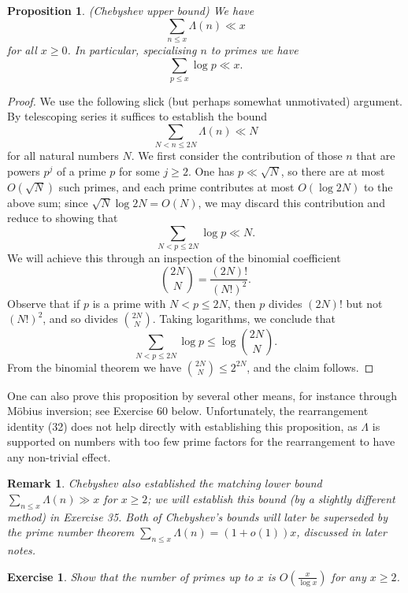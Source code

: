 \documentclass[10pt,reqno]{amsart}
\newtheorem{prop}[theorem]{Proposition}
\newtheorem{exercise}[theorem]{Exercise}
\newtheorem{remark}[theorem]{Remark}
\begin{document}
\begin{prop} (Chebyshev upper bound) We have
    \[  \sum_{n \leq x} \Lambda(n) \ll x\]
    for all $x \geq 0$. In particular, specialising $n$ to primes we have
    \[  \sum_{p \leq x} \log p \ll x.\]
\end{prop}
\begin{proof}
    We use the following slick (but perhaps somewhat unmotivated) argument. By telescoping series it suffices to establish the bound
    \[  \sum_{N < n \leq 2N} \Lambda(n) \ll N\]
    for all natural numbers $N$. We first consider the contribution of those $n$ that are powers $p^j$ of a prime $p$ for some $j \geq 2$. One has $p \ll \sqrt{N}$, so there are at most $O(\sqrt{N})$ such primes, and each prime contributes at most $O( \log 2N )$ to the above sum; since $\sqrt{N} \log 2N = O(N)$, we may discard this contribution and reduce to showing that
    \[  \sum_{N < p \leq 2N} \log p \ll N.\]
    We will achieve this through an inspection of the binomial coefficient
    \[  \binom{2N}{N} = \frac{(2N)!}{(N!)^2}.\]
    Observe that if $p$ is a prime with $N < p \leq 2N$, then $p$ divides $(2N)!$ but not $(N!)^2$, and so divides $\binom{2N}{N}$. Taking logarithms, we conclude that
    \[  \sum_{N < p \leq 2N} \log p \leq \log \binom{2N}{N}.\]
    From the binomial theorem we have $\binom{2N}{N} \leq 2^{2N}$, and the claim follows. %
\end{proof}

One can also prove this proposition by several other means, for instance through Möbius inversion; see Exercise 60 below. Unfortunately, the rearrangement identity (32) does not help directly with establishing this proposition, as $\Lambda$ is supported on numbers with too few prime factors for the rearrangement to have any non-trivial effect.

\begin{remark}
    Chebyshev also established the matching lower bound $\sum_{n \leq x} \Lambda(n) \gg x$ for $x \geq 2$; we will establish this bound (by a slightly different method) in Exercise 35. Both of Chebyshev’s bounds will later be superseded by the \emph{prime number theorem} $\sum_{n \leq x} \Lambda(n) = (1+o(1)) x$, discussed in later notes.
\end{remark}

\begin{exercise}
    Show that the number of primes up to $x$ is $O( \frac{x}{\log x} )$ for any $x \geq 2$.
\end{exercise}
\end{document}
